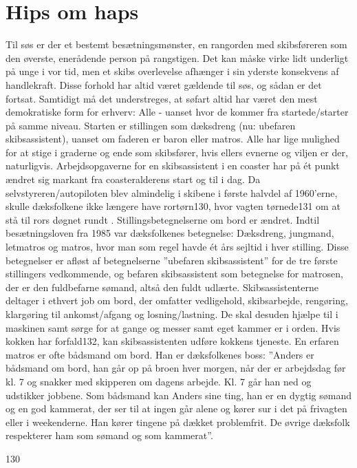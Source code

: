 \chapter{Hips om haps}\label{hips-om-haps}

Til søs er der et bestemt besætningsmønster, en rangorden med
skibsføreren som den øverste, enerådende person på rangstigen. Det kan
måske virke lidt underligt på unge i vor tid, men et skibs overlevelse
afhænger i sin yderste konsekvens af handlekraft. Disse forhold har
altid været gældende til søs, og sådan er det fortsat. Samtidigt må det
understreges, at søfart altid har været den mest demokratiske form for
erhverv: Alle - uanset hvor de kommer fra startede/starter på samme
niveau. Starten er stillingen som dæksdreng (nu: ubefaren
skibsassistent), uanset om faderen er baron eller matros. Alle har lige
mulighed for at stige i graderne og ende som skibsfører, hvis ellers
evnerne og viljen er der, naturligvis. Arbejdsopgaverne for en
skibsassistent i en coaster har på ét punkt ændret sig markant fra
coasteralderens start og til i dag. Da selvstyreren/autopiloten blev
almindelig i skibene i første halvdel af 1960'erne, skulle dæksfolkene
ikke længere have rortørn130, hvor vagten tørnede131 om at stå til rors
døgnet rundt . Stillingsbetegnelserne om bord er ændret. Indtil
besætningsloven fra 1985 var dæksfolkenes betegnelse: Dæksdreng,
jungmand, letmatros og matros, hvor man som regel havde ét års sejltid i
hver stilling. Disse betegnelser er afløst af betegnelserne ''ubefaren
skibsassistent'' for de tre første stillingers vedkommende, og befaren
skibsassistent som betegnelse for matrosen, der er den fuldbefarne
sømand, altså den fuldt udlærte. Skibsassistenterne deltager i ethvert
job om bord, der omfatter vedligehold, skibsarbejde, rengøring,
klargøring til ankomst/afgang og losning/lastning. De skal desuden
hjælpe til i maskinen samt sørge for at gange og messer samt eget kammer
er i orden. Hvis kokken har forfald132, kan skibsassistenten udføre
kokkens tjeneste. En erfaren matros er ofte bådsmand om bord. Han er
dæksfolkenes boss: ''Anders er bådsmand om bord, han går op på broen
hver morgen, når der er arbejdsdag før kl. 7 og snakker med skipperen om
dagens arbejde. Kl. 7 går han ned og udstikker jobbene. Som bådsmand kan
Anders sine ting, han er en dygtig sømand og en god kammerat, der ser
til at ingen går alene og kører sur i det på frivagten eller i
weekenderne. Han kører tingene på dækket problemfrit. De øvrige dæksfolk
respekterer ham som sømand og som kammerat''.

130

